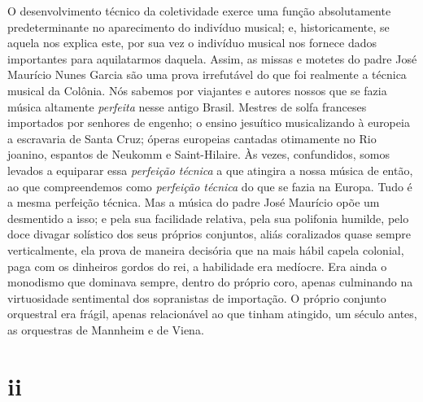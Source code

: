 O desenvolvimento técnico da coletividade exerce uma função
absolutamente predeterminante no aparecimento do indivíduo musical; e,
historicamente, se aquela nos explica este, por sua vez o indivíduo
musical nos fornece dados importantes para aquilatarmos daquela. Assim,
as missas e motetes do padre José Maurício Nunes Garcia são uma prova
irrefutável do que foi realmente a técnica musical da Colônia. Nós
sabemos por viajantes e autores nossos que se fazia música altamente
\textit{perfeita} nesse antigo Brasil. Mestres de solfa franceses importados
por senhores de engenho; o ensino jesuítico musicalizando à europeia a
escravaria de Santa Cruz; óperas europeias cantadas otimamente no Rio
joanino, espantos de Neukomm e Saint-Hilaire. Às vezes, confundidos,
somos levados a equiparar essa \textit{perfeição técnica} a que atingira a
nossa música de então, ao que compreendemos como \textit{perfeição técnica}
do que se fazia na Europa. Tudo é a mesma perfeição técnica. Mas a
música do padre José Maurício opõe um desmentido a isso; e pela sua
facilidade relativa, pela sua polifonia humilde, pelo doce divagar
solístico dos seus próprios conjuntos, aliás coralizados quase sempre
verticalmente, ela prova de maneira decisória que na mais hábil capela
colonial, paga com os dinheiros gordos do rei, a habilidade era
medíocre. Era ainda o monodismo que dominava sempre, dentro do próprio
coro, apenas culminando na virtuosidade sentimental dos sopranistas de
importação. O próprio conjunto orquestral era frágil, apenas
relacionável ao que tinham atingido, um século antes, as orquestras de
Mannheim e de Viena.

\section*{ii}

